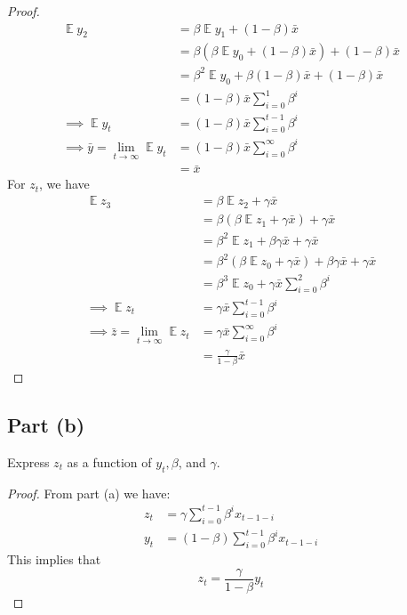 \documentclass{amsart}
\DeclareMathOperator{\ee}{\mathbb{E}}
\theoremstyle{definition}
\begin{document}
\begin{proof}
    \begin{align*}
        \ee{y_2} &= \beta \ee{y_1} + (1 - \beta) \bar{x} \\
        &= \beta( \beta \ee{y_0} + (1 - \beta) \bar{x}) + (1 - \beta) \bar{x} \\
        &= \beta^2 \ee{y_0} + \beta(1 - \beta) \bar{x} + (1 - \beta) \bar{x} \\
        &= (1 - \beta) \bar{x} \sum_{i = 0}^1 \beta^i\\
        \implies \ee{y_t} &= (1 - \beta) \bar{x} \sum_{i = 0}^{t - 1} \beta^i\\
        \implies \bar{y} = \lim_{t \to \infty} \ee{y_t} &= (1 - \beta) \bar{x} \sum_{i = 0}^{\infty} \beta^i\\
        &= \bar{x}
    \end{align*}
    For $z_t$, we have
    \begin{align*}
        \ee{z_3} &= \beta \ee{z_2} + \gamma \bar{x} \\
        &= \beta( \beta \ee{z_1} + \gamma \bar{x}) + \gamma \bar{x} \\
        &= \beta^2 \ee{z_1} + \beta \gamma \bar{x} + \gamma \bar{x} \\
        &= \beta^2 ( \beta \ee{z_0} + \gamma \bar{x}) + \beta \gamma \bar{x} + \gamma \bar{x} \\
        &= \beta^3 \ee{z_0} + \gamma \bar{x} \sum_{i = 0}^2 \beta^i\\
        \implies \ee{z_t} &=  \gamma \bar{x} \sum_{i = 0}^{t - 1} \beta^i\\
        \implies \bar{z} = \lim_{t \to \infty} \ee{z_t} &= \gamma \bar{x} \sum_{i = 0}^{\infty} \beta^i\\
        &= \frac{\gamma}{1 - \beta} \bar{x}
    \end{align*}
\end{proof}

\subsection*{Part (b)} Express $z_t$ as a function of $y_t, \beta$, and $\gamma$.
\begin{proof}
    From part (a) we have:
    \begin{align*}
        z_t &= \gamma \sum_{i = 0} ^{t - 1} \beta^i x_{t - 1 - i} \\
        y_t &= (1 - \beta)\sum_{i = 0} ^{t - 1} \beta^i x_{t - 1 - i}
    \end{align*}
    This implies that 
    \[
    z_t = \frac{\gamma}{1-\beta} y_t
    \]
\end{proof}
\end{document}
